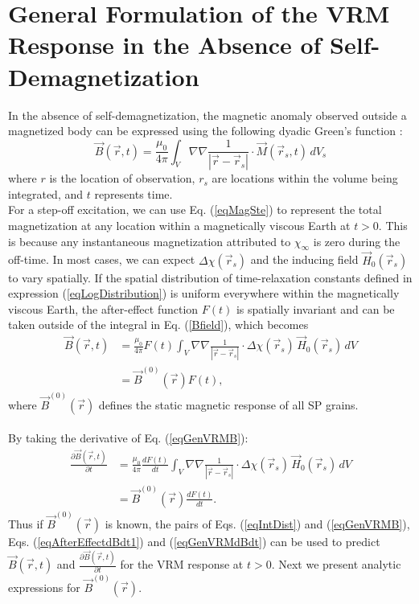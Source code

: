 \documentclass[journal]{IEEEtran}  %
\begin{document}
\section{General Formulation of the VRM Response in the Absence of Self-Demagnetization}
\label{secSelfDemag}

In the absence of self-demagnetization,  the magnetic anomaly
observed outside a magnetized body can be expressed using the
following dyadic Green's function \cite{Blakely1996}:
\begin{equation}
\vec B(\vec r,t) = \frac{\mu_0}{4 \pi} \int_{V} \nabla \nabla
\frac{1}{| \vec r - \vec r_s |} \cdot \vec M(\vec r_s, t) \, dV_s
\label{Bfield}
\end{equation}
where $r$ is the location of observation, $r_s$ are locations within the volume being integrated, and $t$ represents time.
\\

For a step-off excitation, we can use Eq.
(\ref{eqMagSte})  to represent the total magnetization at any
location within a magnetically viscous Earth at $t > 0$. This is
because any instantaneous magnetization attributed to $\chi_\infty$
is zero during the off-time. In most cases, we can expect $\Delta
\chi(\vec r_s)$ and the inducing field $\vec H_0(\vec r_s)$ to vary
spatially. If the spatial distribution of time-relaxation constants
defined in expression (\ref{eqLogDistribution}) is uniform
everywhere within the magnetically viscous Earth, the after-effect
function $F(t)$ is spatially invariant and can be taken outside of the
integral in Eq. (\ref{Bfield}), which becomes
\begin{align}
\vec B(\vec r,t) &= \frac{\mu_0}{4 \pi} F(t) \int_V \nabla \nabla \frac{1}{| \vec r - \vec r_s |} \cdot \Delta \chi(\vec r_s) \, \vec H_0(\vec r_s) \, dV \nonumber \\
&= \vec B^{(0)} (\vec r) F(t), \label{eqGenVRMB}
\end{align}
where $\vec B^{(0)}(\vec r)$ defines  the static
magnetic response of all SP grains.
\\\\
By taking the derivative of Eq. (\ref{eqGenVRMB}):
\begin{align}
\frac{\partial \vec B(\vec r,t)}{\partial t} &= \frac{\mu_0}{4 \pi} \frac{d F(t)}{dt} \int_V \nabla \nabla \frac{1}{| \vec r - \vec r_s |} \cdot \Delta \chi(\vec r_s) \, \vec H_0(\vec r_s) \, dV \nonumber \\
&= \vec B^{(0)} (\vec r) \frac{d F(t)}{dt}. \label{eqGenVRMdBdt}
\end{align}
Thus if $\vec B^{(0)}(\vec r)$ is known, the pairs of
Eqs. (\ref{eqIntDist}) and (\ref{eqGenVRMB}), Eqs.
(\ref{eqAfterEffectdBdt1}) and (\ref{eqGenVRMdBdt}) can be used to
predict $\vec B(\vec r,t)$ and $\frac{\partial \vec B(\vec
r,t)}{\partial t}$ for the VRM response at $t
> 0$. Next we present analytic expressions for $\vec B^{(0)} (\vec r)$.
\end{document}
